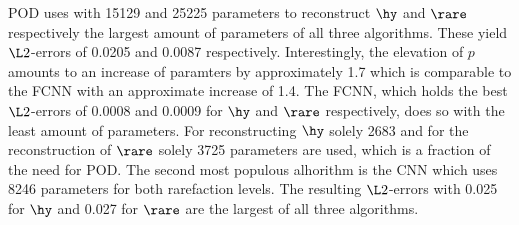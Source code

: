 POD uses with 15129 and 25225 parameters to reconstruct \(\hy\) and \(\rare\) respectively the largest amount of parameters of all three algorithms. These yield \(\L2\)-errors of 0.0205 and 0.0087 respectively. Interestingly, the elevation of \(p\) amounts to an increase of paramters by approximately 1.7 which is comparable to the FCNN with an approximate increase of 1.4. The FCNN, which holds the best \(\L2\)-errors of 0.0008 and 0.0009 for \(\hy\) and \(\rare\) respectively, does so with the least amount of parameters. For reconstructing \(\hy\) solely 2683 and for the reconstruction of \(\rare\) solely 3725 parameters are used, which is a fraction of the need for POD. The second most populous alhorithm is the CNN which uses 8246 parameters for both rarefaction levels. The resulting \(\L2\)-errors with 0.025 for \(\hy\) and 0.027 for \(\rare\) are the largest of all three algorithms. \\

